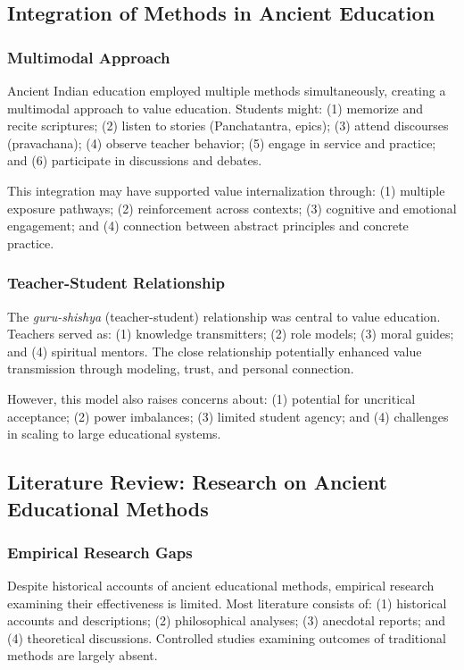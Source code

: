 \documentclass[12pt,a4paper,twocolumn]{article}
\begin{document}
\subsection{Integration of Methods in Ancient Education}

\subsubsection{Multimodal Approach}

Ancient Indian education employed multiple methods simultaneously, creating a multimodal approach to value education. Students might: (1) memorize and recite scriptures; (2) listen to stories (Panchatantra, epics); (3) attend discourses (pravachana); (4) observe teacher behavior; (5) engage in service and practice; and (6) participate in discussions and debates.

This integration may have supported value internalization through: (1) multiple exposure pathways; (2) reinforcement across contexts; (3) cognitive and emotional engagement; and (4) connection between abstract principles and concrete practice.

\subsubsection{Teacher-Student Relationship}

The \textit{guru-shishya} (teacher-student) relationship was central to value education. Teachers served as: (1) knowledge transmitters; (2) role models; (3) moral guides; and (4) spiritual mentors. The close relationship potentially enhanced value transmission through modeling, trust, and personal connection.

However, this model also raises concerns about: (1) potential for uncritical acceptance; (2) power imbalances; (3) limited student agency; and (4) challenges in scaling to large educational systems.

\subsection{Literature Review: Research on Ancient Educational Methods}

\subsubsection{Empirical Research Gaps}

Despite historical accounts of ancient educational methods, empirical research examining their effectiveness is limited. Most literature consists of: (1) historical accounts and descriptions; (2) philosophical analyses; (3) anecdotal reports; and (4) theoretical discussions. Controlled studies examining outcomes of traditional methods are largely absent.
\end{document}
